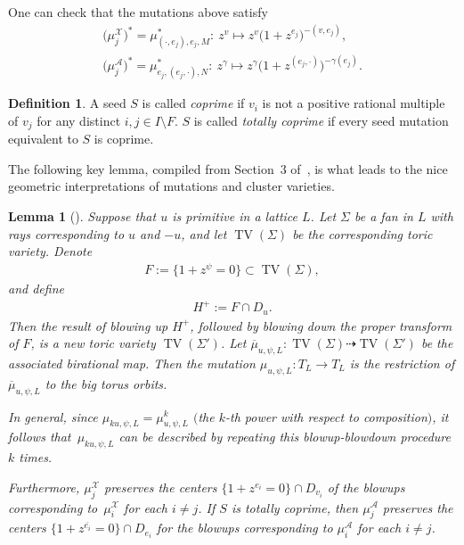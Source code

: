 \documentclass[11pt]{article}
\numberwithin{equation}{section}
\numberwithin{figure}{section}
\numberwithin{table}{section}
\DeclareMathOperator{\TV}{TV}
\let\?=\overline
\let\rar=\rightarrow
\let\s=\mathcal
\newtheorem{lem}[thm]{Lemma}
\theoremstyle{definition}
\newtheorem{dfn}[thm]{Definition}
\begin{document}
One can check that the mutations above satisfy
\begin{gather*}%
	\big(\mu_j^{\s{X}}\big)^*=\mu_{(\cdot,e_j),e_j,M}^*\colon \ z^{v} \mapsto z^{v}\big(1+z^{e_j}\big)^{-(v,e_j)},\\
	\big(\mu_j^{\s{A}}\big)^*=\mu_{e_j,( e_j,\cdot ),N}^*\colon \ z^{\gamma} \mapsto z^{\gamma}\big(1+z^{( e_j,\cdot)}\big)^{-\gamma(e_j)}.
\end{gather*}

\begin{dfn}\label{coprime}A seed $S$ is called {\it coprime} if $v_i$ is not a positive rational multiple of $v_j$ for any distinct $i,j \in I\setminus F$. $S$ is called {\it totally coprime} if every seed mutation equivalent to $S$ is coprime.
\end{dfn}

The following key lemma, compiled from Section~3 of~\cite{GHK3}, is what leads to the nice geometric interpretations of mutations and cluster varieties.

\begin{lem}[\cite{GHK3}]\label{mugeom}Suppose that $u$ is primitive in a lattice $L$. Let $\Sigma$ be a fan in $L$ with rays corresponding to $u$ and $-u$, and let $\TV(\Sigma)$ be the corresponding toric variety. Denote
\begin{gather*}
 F:=\big\{1+z^{\psi}=0\big\}\subset \TV(\Sigma),
\end{gather*}
and define
\begin{gather*}
H^+:=F\cap D_{u}.
\end{gather*}
Then the result of blowing up $H^+$, followed by blowing down the proper transform of $F$, is a new toric variety $\TV(\Sigma')$. Let $\?{\mu}_{u,\psi,L}\colon \TV(\Sigma)\dashrightarrow \TV(\Sigma')$ be the associated birational map. Then the mutation $\mu_{u,\psi,L}\colon T_L\rar T_L$ is the restriction of $\?{\mu}_{u,\psi,L}$ to the big torus orbits.

In general, since $\mu_{ku,\psi,L}=\mu_{u,\psi,L}^k$ $($the $k$-th power with respect to composition$)$, it follows that~$\mu_{ku,\psi,L}$ can be described by repeating this blowup-blowdown procedure $k$ times.

Furthermore, $\mu_j^{\s{X}}$ preserves the centers $\big\{1+z^{e_i}=0\big\}\cap D_{v_i}$ of the blowups corresponding to~$\mu_i^{\s{X}}$ for each $i \neq j$. If $S$ is totally coprime, then $\mu_j^{\s{A}}$ preserves the centers $\big\{1+z^{\?{e_i}}=0\big\}\cap D_{e_i}$ for the blowups corresponding to $\mu_i^{\s{A}}$ for each $i \neq j$.
\end{lem}
\end{document}

